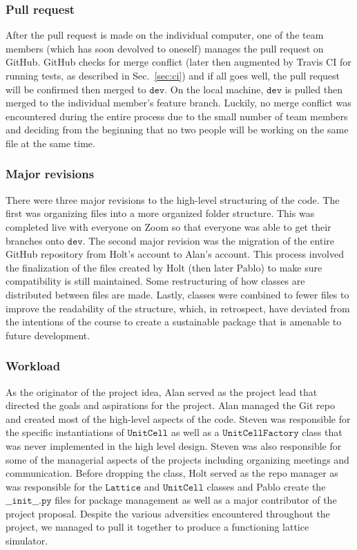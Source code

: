 \documentclass{article}
\begin{document}
\subsubsection{Pull request}
\label{sec:pr}
After the pull request is made on the individual computer, one of the team members (which has soon devolved to oneself) manages the pull request on GitHub.  GitHub checks for merge conflict (later then augmented by Travis CI for running tests, as described in Sec.~\ref{sec:ci}) and if all goes well, the pull request will be confirmed then merged to $\texttt{dev}$.  On the local machine, $\texttt{dev}$ is pulled then merged to the individual member's feature branch.  Luckily, no merge conflict was encountered during the entire process due to the small number of team members and deciding from the beginning that no two people will be working on the same file at the same time.

\subsubsection{Major revisions}
There were three major revisions to the high-level structuring of the code.  The first was organizing files into a more organized folder structure.  This was completed live with everyone on Zoom so that everyone was able to get their branches onto $\texttt{dev}$.  The second major revision was the migration of the entire GitHub repository from Holt's account to Alan's account.  This process involved the finalization of the files created by Holt (then later Pablo) to make sure compatibility is still maintained.  Some restructuring of how classes are distributed between files are made.  Lastly, classes were combined to fewer files to improve the readability of the structure, which, in retrospect, have deviated from the intentions of the course to create a sustainable package that is amenable to future development.

\subsubsection{Workload}
As the originator of the project idea, Alan served as the project lead that directed the goals and aspirations for the project.  Alan managed the Git repo and created most of the high-level aspects of the code.  Steven was responsible for the specific instantiations of $\texttt{UnitCell}$ as well as a $\texttt{UnitCellFactory}$ class that was never implemented in the high level design.  Steven was also responsible for some of the managerial aspects of the projects including organizing meetings and communication.  Before dropping the class, Holt served as the repo manager as was responsible for the $\texttt{Lattice}$ and $\texttt{UnitCell}$ classes and Pablo create the $\texttt{\_\_init\_\_.py}$ files for package management as well as a major contributor of the project proposal.  Despite the various adversities encountered throughout the project, we managed to pull it together to produce a functioning lattice simulator.
\end{document}
